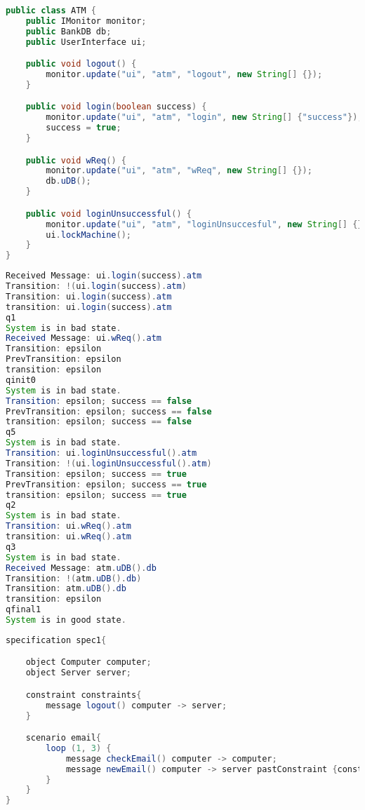 \begin{lstlisting}[language=java, frame=single, float=ht!, caption={7.1. szcenárióhoz tartozó rendszer \textit{ATM} \textit{Java} osztálya.},captionpos=b]
public class ATM {
	public IMonitor monitor;
	public BankDB db;
	public UserInterface ui;

	public void logout() {
		monitor.update("ui", "atm", "logout", new String[] {});
	}

	public void login(boolean success) {
		monitor.update("ui", "atm", "login", new String[] {"success"});
		success = true;
	}

	public void wReq() {
		monitor.update("ui", "atm", "wReq", new String[] {});
		db.uDB();
	}

	public void loginUnsuccessful() {
		monitor.update("ui", "atm", "loginUnsuccesful", new String[] {});
		ui.lockMachine();
	}
}
\end{lstlisting}

\begin{lstlisting}[language=java, frame=single, float=ht!, caption={7.1. szcenárió monitor kimenete.},captionpos=b]
Received Message: ui.login(success).atm
Transition: !(ui.login(success).atm)
Transition: ui.login(success).atm
transition: ui.login(success).atm
q1
System is in bad state.
Received Message: ui.wReq().atm
Transition: epsilon
PrevTransition: epsilon
transition: epsilon
qinit0
System is in bad state.
Transition: epsilon; success == false
PrevTransition: epsilon; success == false
transition: epsilon; success == false
q5
System is in bad state.
Transition: ui.loginUnsuccessful().atm
Transition: !(ui.loginUnsuccessful().atm)
Transition: epsilon; success == true
PrevTransition: epsilon; success == true
transition: epsilon; success == true
q2
System is in bad state.
Transition: ui.wReq().atm
transition: ui.wReq().atm
q3
System is in bad state.
Received Message: atm.uDB().db
Transition: !(atm.uDB().db)
Transition: atm.uDB().db
transition: epsilon
qfinal1
System is in good state.
\end{lstlisting}

\begin{lstlisting}[language=java, frame=single, float=ht!, caption={Loop operátort tartalmazó scenario.},captionpos=b]
specification spec1{

	object Computer computer;
	object Server server;

	constraint constraints{
		message logout() computer -> server;
	}

	scenario email{
		loop (1, 3) {
			message checkEmail() computer -> computer;
			message newEmail() computer -> server pastConstraint {constraints};
		}
	}
}
\end{lstlisting}


